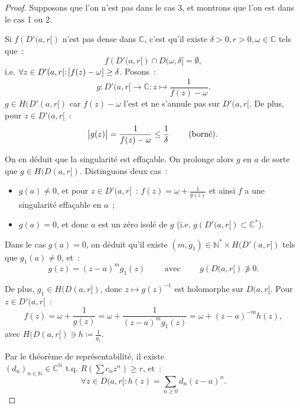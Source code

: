 \documentclass{report}
\theoremstyle{definition}
\theoremstyle{remark}
\numberwithin{equation}{section}
\newcommand{\C}{\mathbb C}
\newcommand{\N}{\mathbb N}
\newcommand{\tq}{\text{ t.q. }}
\begin{document}
			\begin{proof} Supposons que l'on n'est pas dans le cas 3, et montrons que l'on est dans le cas 1 ou 2.

			Si $f\left(D'(a, r[\right)$ n'est pas dense dans $\C$, c'est qu'il existe $\delta > 0, r > 0, \omega \in \C$ tels que~:
			\begin{equation}
				f\left(D'(a, r[\right) \cap D(\omega, \delta[ = \emptyset,
			\end{equation}
			i.e. $\forall z \in D'(a, r[ : \abs {f(z) - \omega} \geq \delta$. Posons~:
			\begin{equation}
				g : D'(a, r[ \to \C : z \mapsto \frac 1{f(z) - \omega}.
			\end{equation}
			$g \in H(D'(a, r[)$ car $f(z)-\omega$ l'est et ne s'annule pas sur $D'(a, r[$. De plus, pour $z \in D'(a, r[$~:
			\begin{equation}
				\abs {g(z)} = \frac 1{f(z)-\omega} \leq \frac 1\delta \qquad \text{ (borné).}
			\end{equation}

			On en déduit que la singularité est effaçable. On prolonge alors $g$ en $a$ de sorte que $g \in H(D(a, r[)$. Distinguons deux cas~:
			\begin{itemize}
				\item $g(a) \neq 0$, et pour $z \in D'(a, r[$~: $f(z) = \omega + \frac 1{g(z)}$ et ainsi $f$ a une singularité effaçable en $a$~;
				\item $g(a) = 0 $, et donc $a$ est un zéro isolé de $g$ (i.e. $g\left(D'(a, r[\right) \subset \C^*$).
			\end{itemize}

			Dans le cas $g(a) = 0$, on déduit qu'il existe $(m, g_1) \in \N^* \times H(D'(a, r[)$ tels que $g_1(a) \neq 0$, et~:
			\begin{equation}
				g(z) = (z-a)^mg_1(z) \qquad \text{ avec } \qquad g\left(D(a, r[\right) \not \ni 0.
			\end{equation}

			De plus, $g_1 \in H(D(a, r[)$, donc $z \mapsto g(z)^{-1}$ est holomorphe sur $D(a, r[$. Pour $z \in D'(a, r[$~:
			\begin{equation}
				f(z) = \omega + \frac 1{g(z)} = \omega + \frac 1{(z-a)^mg_1(z)} = \omega + (z-a)^{-m}h(z),
			\end{equation}
			avec $H(D(a, r[) \ni h \coloneqq \frac 1{g_1}$.

			Par le théorème de représentabilité, il existe $(d_n)_{n \in \N} \in \C^\N \tq R(\sum c_nz^n) \geq r$, et~:
			\begin{equation}
				\forall z \in D(a, r[ : h(z) = \sum_{n \geq 0}d_n(z-a)^n.
			\end{equation}


\end{proof}
\end{document}
